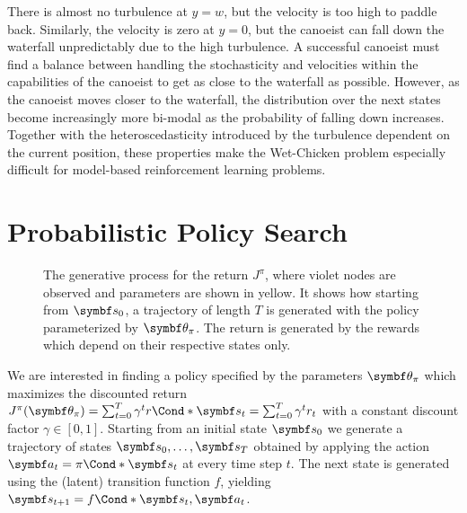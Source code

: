 There is almost no turbulence at $y = w$, but the velocity is too high to paddle back.
Similarly, the velocity is zero at $y = 0$, but the canoeist can fall down the waterfall unpredictably due to the high turbulence.
A successful canoeist must find a balance between handling the stochasticity and velocities within the capabilities of the canoeist to get as close to the waterfall as possible.
However, as the canoeist moves closer to the waterfall, the distribution over the next states become increasingly more bi-modal as the probability of falling down increases.
Together with the heteroscedasticity introduced by the turbulence dependent on the current position, these properties make the Wet-Chicken problem especially difficult for model-based reinforcement learning problems.


\section{Probabilistic Policy Search}
\label{toc:interpretable_rl:probabilistic_policy_search}
\begin{figure}[t]
    \centering
    
    \caption{
        \label{fig:interpretable_rl:graphical_model:rl}
        The generative process for the return $J^\pi$, where violet nodes are observed and parameters are shown in yellow.
        It shows how starting from $\mat{s}_0$, a trajectory of length $T$ is generated with the policy parameterized by $\mat{\theta}_\pi$.
        The return is generated by the rewards which depend on their respective states only.
    }
\end{figure}
We are interested in finding a policy specified by the parameters $\mat{\theta}_\pi$ which maximizes the discounted return
$J^\pi(\mat{\theta}_\pi) = \sum_{t=0}^T \gamma^t \Fun*{r}{\mat{s}_t} = \sum_{t=0}^T \gamma^t r_t$ with a constant discount factor $\gamma \in [0, 1]$.
Starting from an initial state $\mat{s}_0$ we generate a trajectory of states $\mat{s}_0, \ldots, \mat{s}_T$ obtained by applying the action $\mat{a}_t = \Fun*{\pi}{\mat{s}_t}$ at every time step $t$.
The next state is generated using the (latent) transition function $f$, yielding $\mat{s}_{t+1} = \Fun*{f}{\mat{s}_t, \mat{a}_t}$.

